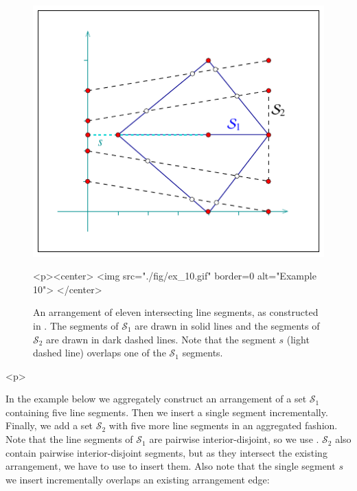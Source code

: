 \begin{figure}[!htp]
\begin{ccTexOnly}
  \begin{center}
  \includegraphics{Arrangement_2/fig/ex_10}
  \end{center}
\end{ccTexOnly}
\begin{ccHtmlOnly}
  <p><center>
  <img src="./fig/ex_10.gif" border=0 alt="Example 10">
  </center>
\end{ccHtmlOnly}
\caption{An arrangement of eleven intersecting line segments, as
constructed in . The segments of ${\mathcal S}_1$
are drawn in solid lines and the segments of ${\mathcal S}_2$ are
drawn in dark dashed lines. Note that the segment $s$ (light
dashed line) overlaps one of the ${\mathcal S}_1$ segments.}
\label{arr_fig:ex_10}
\end{figure}

\begin{ccHtmlOnly}<p>\end{ccHtmlOnly}
In the example below we aggregately construct an arrangement of a set
${\mathcal S}_1$ containing five line segments. Then we insert a single
segment incrementally. Finally, we add a set ${\mathcal S}_2$ with
five more line segments in an aggregated fashion. Note 
that the line segments of ${\mathcal S}_1$ are pairwise
interior-disjoint, so we use .
${\mathcal S}_2$ also contain pairwise interior-disjoint segments,
but as they intersect the existing arrangement, we have to use
 to insert them. Also note that the
single segment $s$ we insert incrementally overlaps an existing
arrangement edge:

